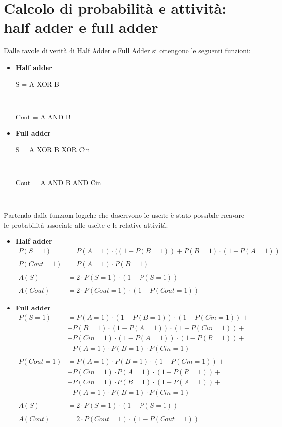 \documentclass[11pt,  english, makeidx, a4paper, titlepage, oneside]{book}
\begin{document}
\section{Calcolo di probabilità e attività: half adder e full adder} 
Dalle tavole di verità di Half Adder e Full Adder si ottengono le seguenti funzioni:
\begin{itemize}
	\item \textbf{Half adder} \\
	\centerline{S = A XOR B} \\
	\centerline{Cout = A AND B}
	\item \textbf{Full adder} \\
	\centerline{S = A XOR B XOR Cin} \\
	\centerline{Cout = A AND B AND Cin} \\
\end{itemize}
Partendo dalle funzioni logiche che descrivono le uscite è stato possibile ricavare le probabilità
associate alle uscite e le relative attività.
\begin{itemize}
	\item \textbf{Half adder}\\
	\begin{align*}
	P(S=1) &= P(A=1) \cdot ((1-P(B=1)) + P(B=1) \cdot (1-P(A=1))\\\\
	P(Cout=1) & = P(A=1) \cdot P(B=1)\\\\
	A(S) &= 2 \cdot P(S=1) \cdot (1-P(S=1))\\\\
    A(Cout) &= 2 \cdot P(Cout=1) \cdot (1-P(Cout=1)) 
    \end{align*}	
	\item \textbf{Full adder}
	\begin{align*}
	P(S=1) & = P(A=1) \cdot(1-P(B=1)) \cdot (1-P(Cin=1)) + \\ 
	          & + P(B=1) \cdot(1-P(A=1)) \cdot (1-P(Cin=1)) + \\
	          & + P(Cin=1) \cdot (1-P(A=1)) \cdot(1-P(B=1)) + \\
	          & + P(A=1) \cdot P(B=1) \cdot P(Cin=1)\\\\
	 P(Cout=1) & = P(A=1) \cdot P(B=1) \cdot (1-P(Cin=1)) +\\
	 					& + P(Cin=1) \cdot P(A=1) \cdot (1-P(B=1)) +\\
	 					& + P(Cin=1) \cdot P(B=1) \cdot (1-P(A=1)) +\\
	 					& + P(A=1) \cdot P(B=1) \cdot P(Cin=1)\\\\
	 A(S) & = 2 \cdot P(S=1) \cdot (1-P(S=1))\\\\
	A(Cout) & = 2 \cdot P(Cout=1) \cdot (1-P(Cout=1))
	\end{align*}	
\end{itemize} 
\end{document}
